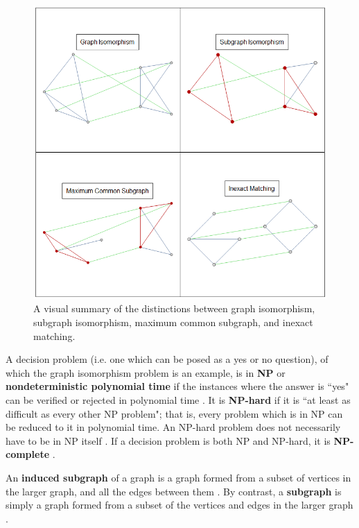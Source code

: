\documentclass[12pt]{thesis}
\theoremstyle{plain}
\theoremstyle{definition}
\theoremstyle{remark}
\begin{document}
\begin{figure}[H]
\centering
\includegraphics[width=\textwidth]{isomorphism_demos.png}
\caption{A visual summary of the distinctions between graph isomorphism, subgraph isomorphism, maximum common subgraph, and inexact matching.}
\label{fig:isomorphism_demos}
\end{figure}

A decision problem (i.e. one which can be posed as a yes or no question), of which the graph isomorphism problem is an example, is in \textbf{NP} or \textbf{nondeterministic polynomial time} if the instances where the answer is ``yes" can be verified or rejected in polynomial time \cite{Hartmanis_1982,wikiNPComplexity}. It is \textbf{NP-hard} if it is ``at least as difficult as every other NP problem"; that is, every problem which is in NP can be reduced to it in polynomial time. An NP-hard problem does not necessarily have to be in NP itself  \cite{Hartmanis_1982,wikiNPHardness}. If a decision problem is both NP and NP-hard, it is \textbf{NP-complete} \cite{Hartmanis_1982,wikiNPCompleteness}.

An \textbf{induced subgraph} of a graph is a graph formed from a subset of vertices in the larger graph, and all the edges between them \cite{wikiInducedSubgraph}. By contrast, a \textbf{subgraph} is simply a graph formed from a subset of the vertices and edges in the larger graph \cite{wikiSubgraph}.
\end{document}
